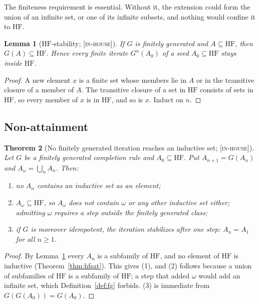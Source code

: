 \documentclass[11pt]{article}
\newcommand{\HF}{\mathrm{HF}}                 \newcommand{\rank}{\operatorname{rank}}
\newcommand{\gradetag}[1]{\textnormal{\textsc{[#1]}}}
\newcommand{\inhouse}{\gradetag{in-house}}
\newtheorem{theorem}{Theorem}[section]
\newtheorem{lemma}[theorem]{Lemma}
\theoremstyle{definition}
\begin{document}
The finiteness requirement is essential. Without it, the extension could form the union of an
infinite set, or one of its infinite subsets, and nothing would confine it to $\HF$.

\begin{lemma}[$\HF$-stability; \inhouse]\label{lem:hfstable}
If $G$ is finitely generated and $A\subseteq\HF$, then $G(A)\subseteq\HF$. Hence every finite
iterate $G^n(A_0)$ of a seed $A_0\subseteq\HF$ stays inside $\HF$.
\end{lemma}

\begin{proof}
A new element $x$ is a finite set whose members lie in $A$ or in the transitive closure of a
member of $A$. The transitive closure of a set in $\HF$ consists of sets in $\HF$, so every member
of $x$ is in $\HF$, and so is $x$. Induct on $n$.
\end{proof}

\subsection{Non-attainment}

\begin{theorem}[No finitely generated iteration reaches an inductive set;
\inhouse]\label{thm:nonattain}
Let $G$ be a finitely generated completion rule and $A_0\subseteq\HF$. Put $A_{n+1}=G(A_n)$ and
$A_\omega=\bigcup_n A_n$. Then:
\begin{enumerate}\itemsep0pt
  \item no $A_n$ contains an inductive set as an element;
  \item $A_\omega\subseteq\HF$, so $A_\omega$ does not contain $\omega$ or any other inductive
  set either; admitting $\omega$ requires a step outside the finitely generated class;
  \item if $G$ is moreover idempotent, the iteration stabilizes after one step:
  $A_n=A_1$ for all $n\ge1$.
\end{enumerate}
\end{theorem}

\begin{proof}
By Lemma~\ref{lem:hfstable} every $A_n$ is a subfamily of $\HF$, and no element of $\HF$ is
inductive (Theorem~\ref{thm:hfsat}). This gives (1), and (2) follows because a union of
subfamilies of $\HF$ is a subfamily of $\HF$; a step that added $\omega$ would add an infinite
set, which Definition~\ref{def:fg} forbids. (3) is immediate from $G(G(A_0))=G(A_0)$.
\end{proof}
\end{document}
